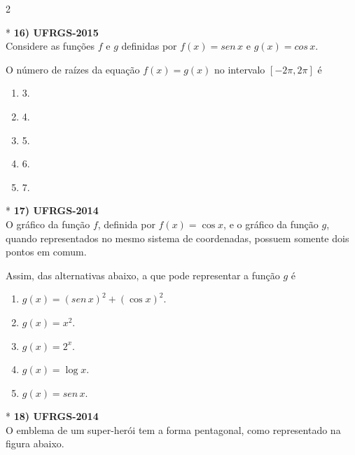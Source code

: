 \documentclass[11pt,a4paper]{article}
\begin{document}
\begin{paracol}{2}
    \switchcolumn[1]
    \vspace{7cm}

    \switchcolumn[0]*
    \textbf{16) UFRGS-2015} \\
    Considere as funções $f$ e $g$ definidas por $f(x) = sen\, x$ e $g(x) = cos\, x$.

    \vspace{0.3cm}
    O número de raízes da equação $f(x) = g(x)$ no intervalo $[-2\pi, 2\pi]$ é

    \begin{enumerate}[label=(\Alph*), itemsep=0.2cm]
        \item 3.
        \item 4.
        \item 5.
        \item 6.
        \item 7.
    \end{enumerate}
    \vspace{0.4cm}

    \switchcolumn[1]
    \vspace{6cm}

    \switchcolumn[0]*
    \textbf{17) UFRGS-2014} \\
    O gráfico da função $f$, definida por $f(x) = \cos x$, e o gráfico da função $g$, quando representados no mesmo sistema de coordenadas, possuem somente dois pontos em comum.

    Assim, das alternativas abaixo, a que pode representar a função $g$ é

    \begin{enumerate}[label=(\Alph*), itemsep=0.2cm]
        \item $g(x) = (sen\, x)^2 + (\cos x)^2$.
        \item $g(x) = x^2$.
        \item $g(x) = 2^x$.
        \item $g(x) = \log x$.
        \item $g(x) = sen\, x$.
    \end{enumerate}
    \vspace{0.4cm}

    \switchcolumn[1]
    \vspace{6.5cm}

    \switchcolumn[0]*
    \textbf{18) UFRGS-2014} \\
    O emblema de um super-herói tem a forma pentagonal, como representado na figura abaixo.

    \vspace{0.3cm}
    \begin{center}
\end{center}
\end{paracol}
\end{document}
